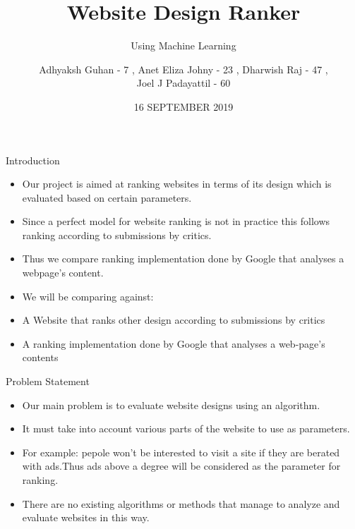 \documentclass[11pt]{beamer}
\begin{document}
	\title{\textbf{Website Design Ranker}}
	\subtitle{Using Machine Learning}
	\date{16 SEPTEMBER 2019}
	\author{{\scriptsize Adhyaksh Guhan - 7 , Anet Eliza Johny - 23 , Dharwish Raj - 47 , \\ Joel J Padayattil - 60}}
	\begin{frame}[plain]
		\maketitle
	\end{frame}
	\begin{frame}{Introduction}
		\begin{itemize}
			
			
			\item Our project is aimed at ranking websites in terms of its design which is evaluated based on certain parameters.
			
			\item Since a perfect model for website ranking  is not in practice this  follows ranking according to submissions by critics.
			
			\item Thus we compare ranking implementation done by Google that analyses a webpage's content.
		
			\item We will be comparing against:
				\item A Website that ranks other design according to submissions by critics
				\item A ranking implementation done by Google that analyses a web-page's contents
		\end{itemize}
	\end{frame}
	\begin{frame}{Problem Statement}
		\begin{itemize}

			\item Our main problem is to evaluate website designs using an algorithm.
			
			\item It must take into account various parts of the website to use as parameters.
			
			\item For example: pepole won't be interested to visit a site if they are berated with ads.Thus ads above a degree will be considered as the parameter for ranking.

			\item There are no existing algorithms or methods that manage to analyze and evaluate websites in this way.
		\end{itemize}
	\end{frame}
\end{document}
